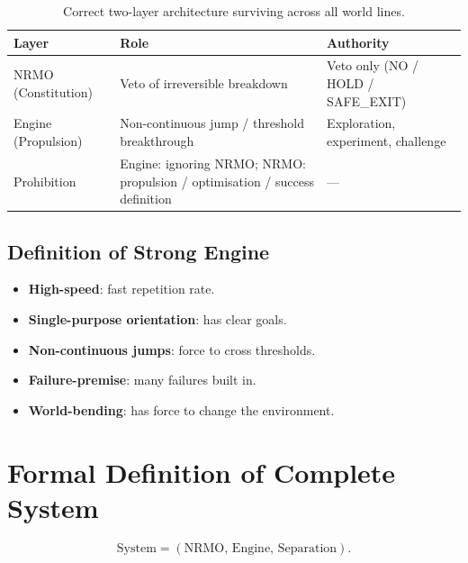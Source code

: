 \begin{table}[ht]
\centering
\small
\begin{tabularx}{\linewidth}{lXX}
\toprule
\textbf{Layer} & \textbf{Role} & \textbf{Authority} \\
\midrule

NRMO (Constitution)
& Veto of irreversible breakdown
& Veto only (NO / HOLD / SAFE\_EXIT) \\

Engine (Propulsion)
& Non-continuous jump / threshold breakthrough
& Exploration, experiment, challenge \\

Prohibition
& Engine: ignoring NRMO; NRMO: propulsion / optimisation / success
definition
& --- \\

\bottomrule
\end{tabularx}
\caption[Caged beast structure]{Correct two-layer architecture
surviving across all world lines.}
\label{tab:caged-beast-structure}
\end{table}

\subsection{Definition of Strong Engine}

\begin{itemize}
\item \textbf{High-speed}: fast repetition rate.
\item \textbf{Single-purpose orientation}: has clear goals.
\item \textbf{Non-continuous jumps}: force to cross thresholds.
\item \textbf{Failure-premise}: many failures built in.
\item \textbf{World-bending}: has force to change the environment.
\end{itemize}

\section{Formal Definition of Complete System}
\label{sec:strong-engine-formal}

\begin{equation}
\mathrm{System} = (\mathrm{NRMO},\, \mathrm{Engine},\,
\mathrm{Separation}).
\end{equation}

